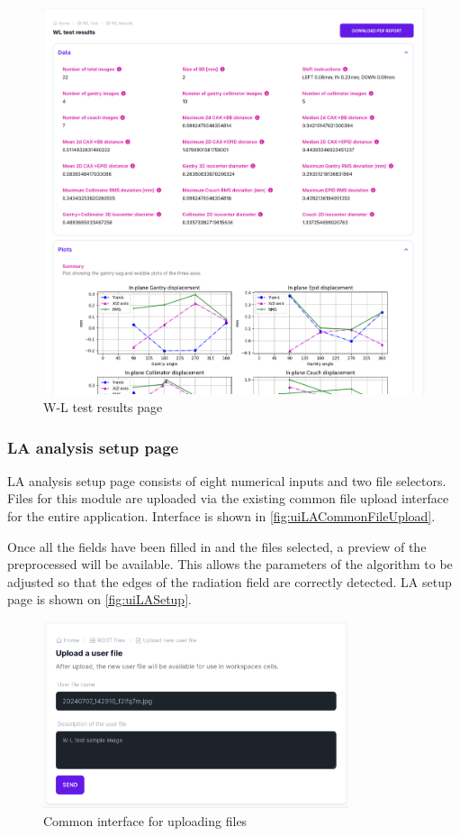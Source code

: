 \begin{figure}
    \centering
    \includegraphics[width=1\textwidth]{Content/Images/ui_wl_results_page.png}
    \caption{W-L test results page}
    \label{fig:uiWLResults}
\end{figure}

\subsubsection{LA analysis setup page}

LA analysis setup page consists of eight numerical inputs and two file selectors. Files for this module are uploaded via the existing common file upload interface for the entire application. Interface is shown in \autoref{fig:uiLACommonFileUpload}.

Once all the fields have been filled in and the files selected, a preview of the preprocessed will be available. This allows the parameters of the algorithm to be adjusted so that the edges of the radiation field are correctly detected. LA setup page is shown on \autoref{fig:uiLASetup}.

\begin{figure}
    \centering
    \includegraphics[width=0.8\textwidth]{Content/Images/ui_la_upload.png}
    \caption{Common interface for uploading files}
    \label{fig:uiLACommonFileUpload}
\end{figure}

